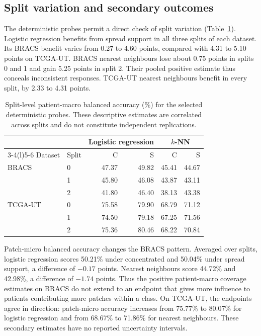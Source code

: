 \subsection{Split variation and secondary outcomes}
The deterministic probes permit a direct check of split variation (Table~\ref{tab:probe-splits}). Logistic regression benefits from spread support in all three splits of each dataset. Its BRACS benefit varies from 0.27 to 4.60 points, compared with 4.31 to 5.10 points on TCGA-UT. BRACS nearest neighbours lose about 0.75 points in splits 0 and 1 and gain 5.25 points in split 2. Their pooled positive estimate thus conceals inconsistent responses. TCGA-UT nearest neighbours benefit in every split, by 2.33 to 4.31 points.

\begin{table}[htbp]
\centering\small
\begin{tabular}{@{}llrrrr@{}}
\toprule
 & & \multicolumn{2}{c}{Logistic regression} & \multicolumn{2}{c}{$k$-NN} \\
\cmidrule(lr){3-4}\cmidrule(l){5-6}
Dataset & Split & C & S & C & S \\
\midrule
BRACS & 0 & 47.37 & 49.82 & 45.41 & 44.67 \\
 & 1 & 45.80 & 46.08 & 43.87 & 43.11 \\
 & 2 & 41.80 & 46.40 & 38.13 & 43.38 \\
\addlinespace
TCGA-UT & 0 & 75.58 & 79.90 & 68.79 & 71.12 \\
 & 1 & 74.50 & 79.18 & 67.25 & 71.56 \\
 & 2 & 75.36 & 80.46 & 68.22 & 70.84 \\
\bottomrule
\end{tabular}
\caption{Split-level patient-macro balanced accuracy (\%) for the selected deterministic probes. These descriptive estimates are correlated across splits and do not constitute independent replications.}
\label{tab:probe-splits}
\end{table}

\noindent Patch-micro balanced accuracy changes the BRACS pattern. Averaged over splits, logistic regression scores 50.21\% under concentrated and 50.04\% under spread support, a difference of $-0.17$ points. Nearest neighbours score 44.72\% and 42.98\%, a difference of $-1.74$ points. Thus the positive patient-macro coverage estimates on BRACS do not extend to an endpoint that gives more influence to patients contributing more patches within a class. On TCGA-UT, the endpoints agree in direction: patch-micro accuracy increases from 75.77\% to 80.07\% for logistic regression and from 68.67\% to 71.86\% for nearest neighbours. These secondary estimates have no reported uncertainty intervals.

